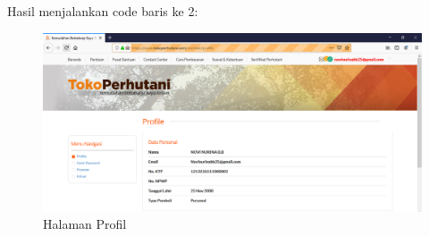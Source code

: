 Hasil menjalankan code baris ke 2:
\begin{figure}[h]
	\centering
	\includegraphics[scale=0.25]{figures/cari}
	\caption{Halaman Profil}
\end{figure}


















































































